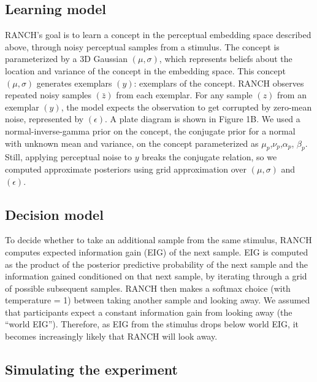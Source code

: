 \documentclass[10pt, letterpaper]{article}
\begin{document}
\hypertarget{learning-model}{%
\subsection{Learning model}\label{learning-model}}

RANCH's goal is to learn a concept in the perceptual embedding space
described above, through noisy perceptual samples from a stimulus. The
concept is parameterized by a 3D Gaussian \((\mu,\sigma)\), which
represents beliefs about the location and variance of the concept in the
embedding space. This concept \((\mu,\sigma)\) generates exemplars
\((y)\): exemplars of the concept. RANCH observes repeated noisy samples
\((\bar{z})\) from each exemplar. For any sample \((z)\) from an
exemplar \((y)\), the model expects the observation to get corrupted by
zero-mean noise, represented by \((\epsilon)\). A plate diagram is shown
in Figure 1B. We used a normal-inverse-gamma prior on the concept, the
conjugate prior for a normal with unknown mean and variance, on the
concept parameterized as \(\mu_{p}\),\(\nu_{p}\),\(\alpha_{p}\),
\(\beta_{p}\). Still, applying perceptual noise to \(y\) breaks the
conjugate relation, so we computed approximate posteriors using grid
approximation over \((\mu,\sigma)\) and \((\epsilon)\).

\hypertarget{decision-model}{%
\subsection{Decision model}\label{decision-model}}

To decide whether to take an additional sample from the same stimulus,
RANCH computes expected information gain (EIG) of the next sample. EIG
is computed as the product of the posterior predictive probability of
the next sample and the information gained conditioned on that next
sample, by iterating through a grid of possible subsequent samples.
RANCH then makes a softmax choice (with temperature = 1) between taking
another sample and looking away. We assumed that participants expect a
constant information gain from looking away (the ``world EIG'').
Therefore, as EIG from the stimulus drops below world EIG, it becomes
increasingly likely that RANCH will look away.

\hypertarget{simulating-the-experiment}{%
\subsection{Simulating the experiment}\label{simulating-the-experiment}}
\end{document}
